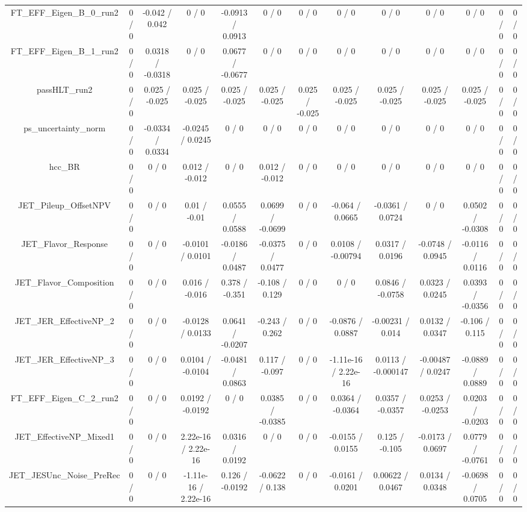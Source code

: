 \documentclass[10pt]{article}
\begin{document}
\begin{table}[htbp]
\begin{center}
\begin{tabular}{|c|c|c|c|c|c|c|c|c|c|c|c|c|}
  FT_EFF_Eigen_B_0_run2 & 0 / 0 & -0.042 / 0.042 & 0 / 0 & -0.0913 / 0.0913 & 0 / 0 & 0 / 0 & 0 / 0 & 0 / 0 & 0 / 0 & 0 / 0 & 0 / 0 & 0 / 0 \\ 
  FT_EFF_Eigen_B_1_run2 & 0 / 0 & 0.0318 / -0.0318 & 0 / 0 & 0.0677 / -0.0677 & 0 / 0 & 0 / 0 & 0 / 0 & 0 / 0 & 0 / 0 & 0 / 0 & 0 / 0 & 0 / 0 \\ 
  passHLT_run2 & 0 / 0 & 0.025 / -0.025 & 0.025 / -0.025 & 0.025 / -0.025 & 0.025 / -0.025 & 0.025 / -0.025 & 0.025 / -0.025 & 0.025 / -0.025 & 0.025 / -0.025 & 0.025 / -0.025 & 0 / 0 & 0 / 0 \\ 
  ps_uncertainty_norm & 0 / 0 & -0.0334 / 0.0334 & -0.0245 / 0.0245 & 0 / 0 & 0 / 0 & 0 / 0 & 0 / 0 & 0 / 0 & 0 / 0 & 0 / 0 & 0 / 0 & 0 / 0 \\ 
  hcc_BR & 0 / 0 & 0 / 0 & 0.012 / -0.012 & 0 / 0 & 0.012 / -0.012 & 0 / 0 & 0 / 0 & 0 / 0 & 0 / 0 & 0 / 0 & 0 / 0 & 0 / 0 \\ 
  JET_Pileup_OffsetNPV & 0 / 0 & 0 / 0 & 0.01 / -0.01 & 0.0555 / 0.0588 & 0.0699 / -0.0699 & 0 / 0 & -0.064 / 0.0665 & -0.0361 / 0.0724 & 0 / 0 & 0.0502 / -0.0308 & 0 / 0 & 0 / 0 \\ 
  JET_Flavor_Response & 0 / 0 & 0 / 0 & -0.0101 / 0.0101 & -0.0186 / 0.0487 & -0.0375 / 0.0477 & 0 / 0 & 0.0108 / -0.00794 & 0.0317 / 0.0196 & -0.0748 / 0.0945 & -0.0116 / 0.0116 & 0 / 0 & 0 / 0 \\ 
  JET_Flavor_Composition & 0 / 0 & 0 / 0 & 0.016 / -0.016 & 0.378 / -0.351 & -0.108 / 0.129 & 0 / 0 & 0 / 0 & 0.0846 / -0.0758 & 0.0323 / 0.0245 & 0.0393 / -0.0356 & 0 / 0 & 0 / 0 \\ 
  JET_JER_EffectiveNP_2 & 0 / 0 & 0 / 0 & -0.0128 / 0.0133 & 0.0641 / -0.0207 & -0.243 / 0.262 & 0 / 0 & -0.0876 / 0.0887 & -0.00231 / 0.014 & 0.0132 / 0.0347 & -0.106 / 0.115 & 0 / 0 & 0 / 0 \\ 
  JET_JER_EffectiveNP_3 & 0 / 0 & 0 / 0 & 0.0104 / -0.0104 & -0.0481 / 0.0863 & 0.117 / -0.097 & 0 / 0 & -1.11e-16 / 2.22e-16 & 0.0113 / -0.000147 & -0.00487 / 0.0247 & -0.0889 / 0.0889 & 0 / 0 & 0 / 0 \\ 
  FT_EFF_Eigen_C_2_run2 & 0 / 0 & 0 / 0 & 0.0192 / -0.0192 & 0 / 0 & 0.0385 / -0.0385 & 0 / 0 & 0.0364 / -0.0364 & 0.0357 / -0.0357 & 0.0253 / -0.0253 & 0.0203 / -0.0203 & 0 / 0 & 0 / 0 \\ 
  JET_EffectiveNP_Mixed1 & 0 / 0 & 0 / 0 & 2.22e-16 / 2.22e-16 & 0.0316 / 0.0192 & 0 / 0 & 0 / 0 & -0.0155 / 0.0155 & 0.125 / -0.105 & -0.0173 / 0.0697 & 0.0779 / -0.0761 & 0 / 0 & 0 / 0 \\ 
  JET_JESUnc_Noise_PreRec & 0 / 0 & 0 / 0 & -1.11e-16 / 2.22e-16 & 0.126 / -0.0192 & -0.0622 / 0.138 & 0 / 0 & -0.0161 / 0.0201 & 0.00622 / 0.0467 & 0.0134 / 0.0348 & -0.0698 / 0.0705 & 0 / 0 & 0 / 0 \\ 

\end{tabular}
\end{center}
\end{table}
\end{document}
